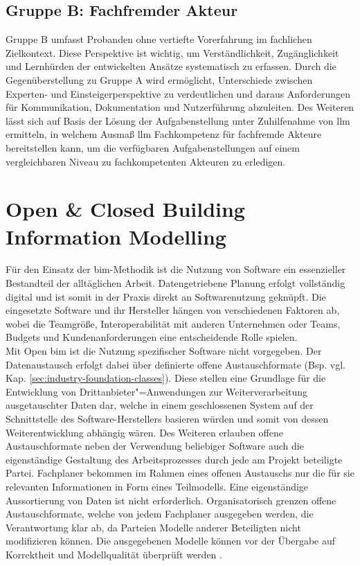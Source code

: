 \subsection{Gruppe B: Fachfremder Akteur}
\label{sec:probandengruppe-b}

Gruppe B umfasst Probanden ohne vertiefte Vorerfahrung im fachlichen Zielkontext. 
Diese Perspektive ist wichtig, um Verständlichkeit, Zugänglichkeit und Lernhürden der entwickelten Ansätze systematisch zu erfassen. 
Durch die Gegenüberstellung zu Gruppe A wird ermöglicht, Unterschiede zwischen Experten- und Einsteigerperspektive zu verdeutlichen und daraus Anforderungen für Kommunikation, Dokumentation und Nutzerführung abzuleiten.
Des Weiteren lässt sich auf Basis der Lösung der Aufgabenstellung unter Zuhilfenahme von \gls{llm} ermitteln, in welchem Ausmaß \gls{llm} Fachkompetenz für fachfremde Akteure bereitstellen kann,
um die verfügbaren Aufgabenstellungen auf einem vergleichbaren Niveau zu fachkompetenten Akteuren zu erledigen.

\section{Open \& Closed Building Information Modelling}
\label{sec:open-closed-bim}

Für den Einsatz der \gls{bim}-Methodik ist die Nutzung von Software ein essenzieller Bestandteil der alltäglichen Arbeit. Datengetriebene Planung erfolgt vollständig digital und ist somit in der Praxis direkt an Softwarenutzung geknüpft.
Die eingesetzte Software und ihr Hersteller hängen von verschiedenen Faktoren ab, wobei die Teamgröße, Interoperabilität mit anderen Unternehmen oder Teams, Budgets und Kundenanforderungen eine entscheidende Rolle spielen. \\

Mit Open \gls{bim} ist die Nutzung spezifischer Software nicht vorgegeben. Der Datenaustausch erfolgt dabei über definierte offene Austauschformate (Bsp. vgl. Kap. \ref{sec:industry-foundation-classes}).
Diese stellen eine Grundlage für die Entwicklung von Drittanbieter"=Anwendungen zur Weiterverarbeitung ausgetauschter Daten dar, welche in einem geschlossenen System auf der Schnittstelle des Software-Herstellers basieren würden und somit von dessen Weiterentwicklung abhängig wären.
Des Weiteren erlauben offene Austauschformate neben der Verwendung beliebiger Software auch die eigenständige Gestaltung des Arbeitsprozesses durch jede am Projekt beteiligte Partei. 
Fachplaner bekommen im Rahmen eines offenen Austauschs nur die für sie relevanten Informationen in Form eines Teilmodells. Eine eigenständige Aussortierung von Daten ist nicht erforderlich.
Organisatorisch grenzen offene Austauschformate, welche von jedem Fachplaner ausgegeben werden, die Verantwortung klar ab, da Parteien Modelle anderer Beteiligten nicht modifizieren können.
Die ausgegebenen Modelle können vor der Übergabe auf Korrektheit und Modellqualität überprüft werden \cite{westphal2018openvsclosedbim}. \\

